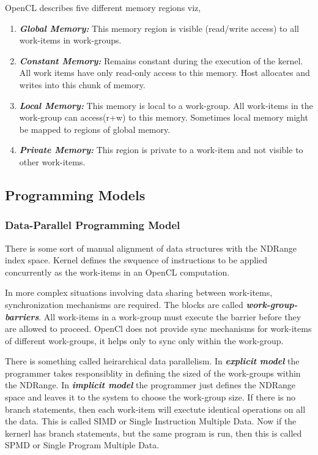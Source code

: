 \documentclass[10pt]{article}
\begin{document}
OpenCL describes five different memory regions viz,

\begin{enumerate}
	\item \textit{\textbf{Global Memory:}} This memory region is visible (read/write access) to all work-items in work-groups. 
	\item \textit{\textbf{Constant Memory:}} Remains constant during the execution of the kernel. All work items have only read-only access to this memory. Host allocates and writes into this chunk of memory.
	\item \textit{\textbf{Local Memory:}} This memory is local to a work-group. All work-items in the work-group can access(r+w) to this memory. Sometimes local memory might be mapped to regions of global memory.
	\item \textit{\textbf{Private Memory:}} This region is private to a work-item and not visible to other work-items.
\end{enumerate}


{\color{red} \date{18-Nov-2020}}
\subsection{Programming Models}
\subsubsection{Data-Parallel Programming Model}
There is some sort of manual alignment of data structures with the NDRange index space. Kernel defines the swquence of instructions to be applied concurrently as the work-items in an OpenCL computation.

In more complex situations involving data sharing between work-items, synchronization mechanisms are required. The blocks are called \textit{\textbf{work-group-barriers}}. All work-items in a work-group must execute the barrier before they are allowed to proceed. OpenCl does not provide sync mechanisms for work-items of different work-groups, it helps only to sync only within the work-group.

There is something called heirarchical data parallelism. In \textit{\textbf{explicit model}} the programmer takes responsiblity in defining the sized of the work-groups within the NDRange. In \textit{\textbf{implicit model}} the programmer just defines the NDRange space and leaves it to the system to choose the work-group size. If there is no branch statements, then each work-item will exectute identical operations on all the data. This is called SIMD or Single Instruction Multiple Data. Now if the kernerl has branch statements, but the same program is run, then this is called SPMD or Single Program Multiple Data.
\end{document}
